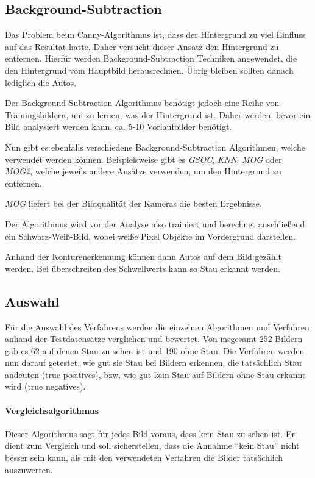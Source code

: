 \subsection{Background-Subtraction}
Das Problem beim Canny-Algorithmus ist, dass der Hintergrund zu viel Einfluss auf das Resultat hatte.
Daher versucht dieser Ansatz den Hintergrund zu entfernen. Hierfür werden Background-Subtraction Techniken angewendet, die den Hintergrund
vom Hauptbild herausrechnen. Übrig bleiben sollten danach lediglich die Autos.

Der Background-Subtraction Algorithmus benötigt jedoch eine Reihe von Trainingsbildern, um zu lernen, was der Hintergrund ist.
Daher werden, bevor ein Bild analysiert werden kann, ca. 5-10 Vorlaufbilder benötigt.

Nun gibt es ebenfalls verschiedene Background-Subtraction Algorithmen, welche verwendet werden können. Beispielsweise gibt es {\em GSOC}, {\em KNN}, {\em MOG} oder {\em MOG2}, welche jeweils andere Ansätze verwenden, um den Hintergrund zu entfernen.

{\em MOG} liefert bei der Bildqualität der Kameras die besten Ergebnisse.

Der Algorithmus wird vor der Analyse also trainiert und berechnet anschließend ein Schwarz-Weiß-Bild, wobei weiße Pixel Objekte im Vordergrund darstellen.

Anhand der Konturenerkennung können dann Autos auf dem Bild gezählt werden. Bei überschreiten des Schwellwerts kann so Stau erkannt werden.

\subsection{Auswahl}
Für die Auswahl des Verfahrens werden die einzelnen Algorithmen und Verfahren anhand der Testdatensätze verglichen und bewertet.
Von insgesamt 252 Bildern gab es 62 auf denen Stau zu sehen ist und 190 ohne Stau.
Die Verfahren werden nun darauf getestet, wie gut sie Stau bei Bildern erkennen, die tatsächlich Stau andeuten (true positives), bzw. wie gut kein Stau auf Bildern ohne Stau erkannt wird (true negatives).

\paragraph{Vergleichsalgorithmus}
Dieser Algorithmus sagt für jedes Bild voraus, dass kein Stau zu sehen ist. Er dient zum Vergleich und soll sicherstellen, dass die Annahme "`kein Stau"' nicht besser sein kann, als mit den verwendeten Verfahren die Bilder tatsächlich auszuwerten.

